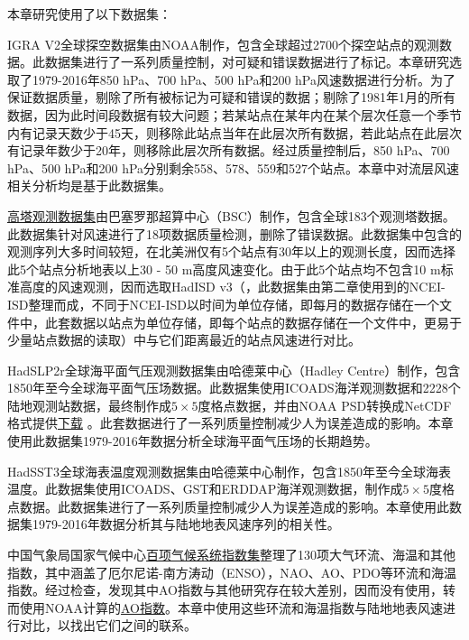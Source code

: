 本章研究使用了以下数据集：

IGRA V2全球探空数据集\citep{durre2006overview}由NOAA制作，包含全球超过2700个探空站点的观测数据。此数据集进行了一系列质量控制，对可疑和错误数据进行了标记。本章研究选取了1979-2016年850 hPa、700 hPa、500 hPa和200 hPa风速数据进行分析。为了保证数据质量，剔除了所有被标记为可疑和错误的数据；剔除了1981年1月的所有数据，因为此时间段数据有较大问题\citep{vautard2010northern}；若某站点在某年内在某个层次任意一个季节内有记录天数少于45天，则移除此站点当年在此层次所有数据，若此站点在此层次有记录年数少于20年，则移除此层次所有数据。经过质量控制后，850 hPa、700 hPa、500 hPa和200 hPa分别剩余558、578、559和527个站点。本章中对流层风速相关分析均是基于此数据集。

\href{https://b2share.eudat.eu/records/159158152f4d4be79559e2f3f6b1a410}{高塔观测数据集}由巴塞罗那超算中心（BSC）制作，包含全球183个观测塔数据。此数据集针对风速进行了18项数据质量检测，删除了错误数据。此数据集中包含的观测序列大多时间较短，在北美洲仅有5个站点有30年以上的观测长度，因而选择此5个站点分析地表以上30 - 50 m高度风速变化。由于此5个站点均不包含10 m标准高度的风速观测，因而选取HadISD v3（\citet{dunn2012hadisd:}，此数据集由第二章使用到的NCEI-ISD整理而成，不同于NCEI-ISD以时间为单位存储，即每月的数据存储在一个文件中，此套数据以站点为单位存储，即每个站点的数据存储在一个文件中，更易于少量站点数据的读取）中与它们距离最近的站点风速进行对比。

HadSLP2r全球海平面气压观测数据集\citep{allan2006a}由哈德莱中心（Hadley Centre）制作，包含1850年至今全球海平面气压场数据。此数据集使用ICOADS海洋观测数据和2228个陆地观测站数据，最终制作成$5 \times 5$度格点数据，并由NOAA PSD转换成NetCDF格式提供\href{https://www.esrl.noaa.gov/psd/gcos_wgsp/Gridded/data.hadslp2.html}{下载} 。此套数据进行了一系列质量控制减少人为误差造成的影响。本章使用此数据集1979-2016年数据分析全球海平面气压场的长期趋势。

HadSST3全球海表温度观测数据集\citep{kennedy2011reassessing1,kennedy2011reassessing2}由哈德莱中心制作，包含1850年至今全球海表温度。此数据集使用ICOADS、GST和ERDDAP海洋观测数据，制作成$5 \times 5$度格点数据。此数据集进行了一系列质量控制减少人为误差造成的影响。本章使用此数据集1979-2016年数据分析其与陆地地表风速序列的相关性。

中国气象局国家气候中心\href{https://cmdp.ncc-cma.net/Monitoring/cn_index_130.php}{百项气候系统指数集}整理了130项大气环流、海温和其他指数，其中涵盖了厄尔尼诺-南方涛动（ENSO），NAO、AO、PDO等环流和海温指数。经过检查，发现其中AO指数与其他研究存在较大差别，因而没有使用，转而使用NOAA计算的\href{https://www.ncdc.noaa.gov/teleconnections/ao/}{AO指数}。本章中使用这些环流和海温指数与陆地地表风速进行对比，以找出它们之间的联系。

